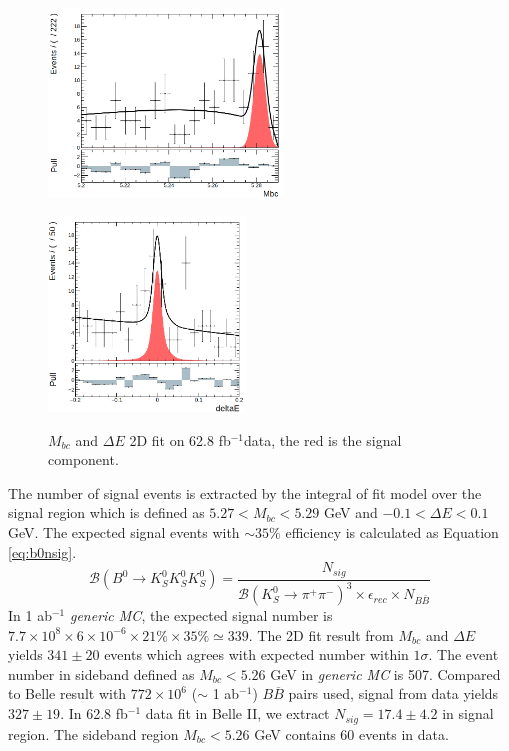 \begin{figure}[htbp]
	\begin{minipage}[b]{0.5\linewidth}
		\centering 
		\includegraphics[height=5cm]{figures/mbc_data_new}
		\label{}
	\end{minipage}
	\begin{minipage}[b]{0.5\linewidth}
		\centering 
		\includegraphics[height=5.2cm]{figures/dE_data_new}
		\label{}
	\end{minipage}
\caption{$M_{bc}$ and $\Delta E$ 2D fit on 62.8 fb$^{-1}$data, the red is the signal component.}
\label{fig:2Ddata}
\end{figure}

 The number of signal events is extracted by the integral of fit model over the signal region which is defined as $5.27 < M_{bc} < 5.29 $ GeV and $-0.1 < \Delta E < 0.1$ GeV.
 The expected signal events with $\sim 35\%$ efficiency is calculated as Equation \ref{eq:b0nsig}.
 \begin{equation}\label{eq:b0nsig}
 \mathcal{B}(B^0 \to K_S^0  K_S^0  K_S^0)=
 \frac{N_{sig}}{\mathcal{B}(K_S^0\to \pi^+\pi^-)^3\times
 	\epsilon_{rec}\times N_{B\bar{B}}}
 \end{equation}
 In 1 ab$^{-1}$ \textit{generic MC}, the expected signal number is $7.7\times 10^8 \times 6\times 10^{-6} \times 21\% \times 35\% \simeq 339$. The 2D fit result from $M_{bc}$ and $\Delta E$ yields $341\pm 20$ events which agrees with expected number within $1\sigma$. The event number in sideband defined as $M_{bc}<5.26$ GeV in \textit{generic MC} is 507. Compared to Belle result with $772\times 10^6$ ($\sim$ 1 ab$^{-1}$) $B\overline{B}$ pairs used, signal from data yields $327\pm 19$. In 62.8 fb$^{-1}$ data fit in Belle II, we extract $N_{sig} = 17.4 \pm 4.2$ in signal region. The sideband region $M_{bc}<5.26$ GeV contains 60 events in data. 
 

